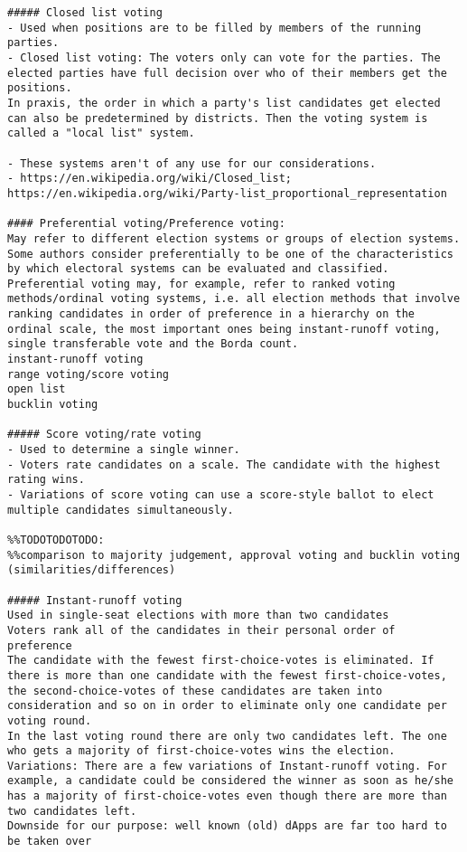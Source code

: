 {{\begin{verbatim}
##### Closed list voting
- Used when positions are to be filled by members of the running parties. 
- Closed list voting: The voters only can vote for the parties. The elected parties have full decision over who of their members get the positions. 
In praxis, the order in which a party's list candidates get elected can also be predetermined by districts. Then the voting system is called a "local list" system.  

- These systems aren't of any use for our considerations. 
- https://en.wikipedia.org/wiki/Closed_list; https://en.wikipedia.org/wiki/Party-list_proportional_representation

#### Preferential voting/Preference voting: 
May refer to different election systems or groups of election systems. Some authors consider preferentially to be one of the characteristics by which electoral systems can be evaluated and classified. 
Preferential voting may, for example, refer to ranked voting methods/ordinal voting systems, i.e. all election methods that involve ranking candidates in order of preference in a hierarchy on the ordinal scale, the most important ones being instant-runoff voting, single transferable vote and the Borda count. 
instant-runoff voting
range voting/score voting
open list
bucklin voting

##### Score voting/rate voting 
- Used to determine a single winner. 
- Voters rate candidates on a scale. The candidate with the highest rating wins.  
- Variations of score voting can use a score-style ballot to elect multiple candidates simultaneously.

%%TODOTODOTODO: 
%%comparison to majority judgement, approval voting and bucklin voting (similarities/differences)

##### Instant-runoff voting 
Used in single-seat elections with more than two candidates 
Voters rank all of the candidates in their personal order of preference
The candidate with the fewest first-choice-votes is eliminated. If there is more than one candidate with the fewest first-choice-votes, the second-choice-votes of these candidates are taken into consideration and so on in order to eliminate only one candidate per voting round. 
In the last voting round there are only two candidates left. The one who gets a majority of first-choice-votes wins the election. 
Variations: There are a few variations of Instant-runoff voting. For example, a candidate could be considered the winner as soon as he/she has a majority of first-choice-votes even though there are more than two candidates left. 
Downside for our purpose: well known (old) dApps are far too hard to be taken over


\end{verbatim}}}
